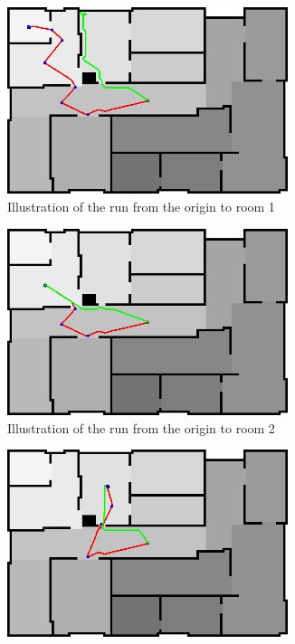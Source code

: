 \documentclass[../Head/Main.tex]{subfiles}
\begin{document}
\begin{figure}[H]
  \begin{subfigure}[b]{0.49\textwidth}
    \centering
    \includegraphics[width=0.9\textwidth]{Modelbased_vs_Sensorbased/brushfireAndBugTest1}
    \caption{Illustration of the run from the origin to room 1}
    \label{fig:Test1}
  \end{subfigure}
  \hfill
  \begin{subfigure}[b]{0.49\textwidth}
    \centering
    \includegraphics[width=0.9\textwidth]{Modelbased_vs_Sensorbased/brushfireAndBugTest2}
    \caption{Illustration of the run from the origin to room 2}
    \label{fig:Test2}
  \end{subfigure}
  \hfill
  \begin{subfigure}[b]{0.49\textwidth}
    \centering
    \includegraphics[width=0.9\textwidth]{Modelbased_vs_Sensorbased/brushfireAndBugTest3}

\end{subfigure}
\end{figure}
\end{document}
